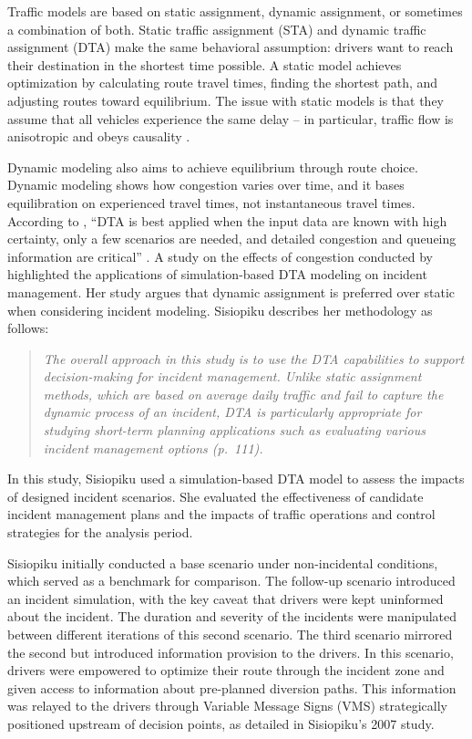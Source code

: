 \documentclass[
  letterpaper,
  authoryear]{elsarticle}
\begin{document}
Traffic models are based on static assignment, dynamic assignment, or
sometimes a combination of both. Static traffic assignment (STA) and
dynamic traffic assignment (DTA) make the same behavioral assumption:
drivers want to reach their destination in the shortest time possible. A
static model achieves optimization by calculating route travel times,
finding the shortest path, and adjusting routes toward equilibrium. The
issue with static models is that they assume that all vehicles
experience the same delay -- in particular, traffic flow is anisotropic
and obeys causality \citep{boyles2018}.

Dynamic modeling also aims to achieve equilibrium through route choice.
Dynamic modeling shows how congestion varies over time, and it bases
equilibration on experienced travel times, not instantaneous travel
times. According to \citet{boyles2018}, ``DTA is best applied when the
input data are known with high certainty, only a few scenarios are
needed, and detailed congestion and queueing information are critical''
\citep[ p.~28]{boyles2018}. A study on the effects of congestion
conducted by \citet{sisiopiku2007} highlighted the applications of
simulation-based DTA modeling on incident management. Her study argues
that dynamic assignment is preferred over static when considering
incident modeling. Sisiopiku describes her methodology as follows:

\begin{quote}
\emph{The overall approach in this study is to use the DTA capabilities
to support decision-making for incident management. Unlike static
assignment methods, which are based on average daily traffic and fail to
capture the dynamic process of an incident, DTA is particularly
appropriate for studying short-term planning applications such as
evaluating various incident management options (p.~111).}
\end{quote}

In this study, Sisiopiku used a simulation-based DTA model to assess the
impacts of designed incident scenarios. She evaluated the effectiveness
of candidate incident management plans and the impacts of traffic
operations and control strategies for the analysis period.

Sisiopiku initially conducted a base scenario under non-incidental
conditions, which served as a benchmark for comparison. The follow-up
scenario introduced an incident simulation, with the key caveat that
drivers were kept uninformed about the incident. The duration and
severity of the incidents were manipulated between different iterations
of this second scenario. The third scenario mirrored the second but
introduced information provision to the drivers. In this scenario,
drivers were empowered to optimize their route through the incident zone
and given access to information about pre-planned diversion paths. This
information was relayed to the drivers through Variable Message Signs
(VMS) strategically positioned upstream of decision points, as detailed
in Sisiopiku's 2007 study.
\end{document}

